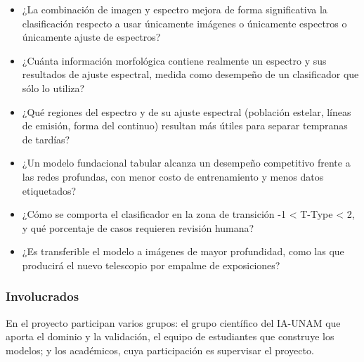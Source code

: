 \documentclass[12pt]{article}
\begin{document}
\begin{itemize}
    \item ¿La combinación de imagen y espectro mejora de forma significativa la clasificación respecto a usar únicamente imágenes o únicamente espectros o únicamente ajuste de espectros?
    \item ¿Cuánta información morfológica contiene realmente un espectro y sus resultados de ajuste espectral, medida como desempeño de un clasificador que sólo lo utiliza?
    \item ¿Qué regiones del espectro y de su ajuste espectral (población estelar, líneas de emisión, forma del continuo) resultan más útiles para separar tempranas de tardías?
    \item ¿Un modelo fundacional tabular alcanza un desempeño competitivo frente a las redes profundas, con menor costo de entrenamiento y menos datos etiquetados?
    \item ¿Cómo se comporta el clasificador en la zona de transición -1 < T-Type < 2, y qué porcentaje de casos requieren revisión humana?
    \item ¿Es transferible el modelo a imágenes de mayor profundidad, como las que producirá el nuevo telescopio por empalme de exposiciones?
\end{itemize}

\subsubsection{Involucrados}

En el proyecto participan varios grupos: el grupo científico del IA-UNAM que aporta el dominio y la validación, el equipo de estudiantes que construye los modelos; y los académicos, cuya participación es supervisar el proyecto.
\end{document}
